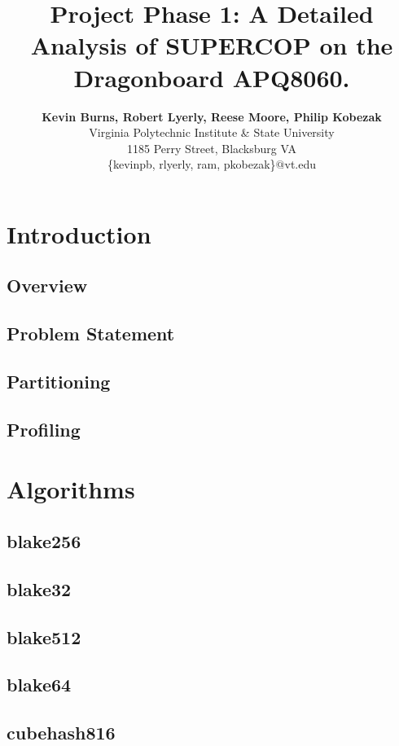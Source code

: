 \documentclass[10pt,a4paper]{article}
\title{\LARGE
    Project Phase 1: A Detailed Analysis of SUPERCOP on the Dragonboard APQ8060.
}
\author{\large
{\bf Kevin Burns, Robert Lyerly, Reese Moore, Philip Kobezak}\\ 
Virginia Polytechnic Institute \& State University\\
1185 Perry Street, Blacksburg VA\\
\vspace{8mm}
\{kevinpb, rlyerly, ram, pkobezak\}$@$vt.edu\\
}
\date{}
\begin{document}
\maketitle


\section{Introduction}
\subsection{Overview}
\subsection{Problem Statement}
\subsection{Partitioning}
\subsection{Profiling}



\section{Algorithms}
\subsection{blake256}
\subsection{blake32}
\subsection{blake512}
\subsection{blake64}
\subsection{cubehash816}
\end{document}
